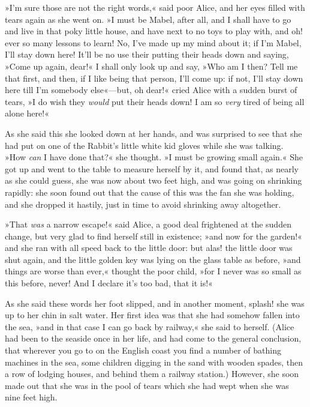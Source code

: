 »I'm sure those are not the right words,« said poor Alice, and her eyes filled with tears again as she went on. »I must be Mabel, after all, and I shall have to go and live in that poky little house, and have next to no toys to play with, and oh! ever so many lessons to learn! No, I've made up my mind about it; if I'm Mabel, I'll stay down here! It'll be no use their putting their heads down and saying, »Come up again, dear!« I shall only look up and say, »Who am I then? Tell me that first, and then, if I like being that person, I'll come up: if not, I'll stay down here till I'm somebody else«—but, oh dear!« cried Alice with a sudden burst of tears, »I do wish they \textit{would} put their heads down! I am so \textit{very} tired of being all alone here!«




As she said this she looked down at her hands, and was surprised to see that she had put on one of the Rabbit's little white kid gloves while she was talking. »How \textit{can} I have done that?« she thought. »I must be growing small again.« She got up and went to the table to measure herself by it, and found that, as nearly as she could guess, she was now about two feet high, and was going on shrinking rapidly: she soon found out that the cause of this was the fan she was holding, and she dropped it hastily, just in time to avoid shrinking away altogether.

»That \textit{was} a narrow escape!« said Alice, a good deal frightened at the sudden change, but very glad to find herself still in existence; »and now for the garden!« and she ran with all speed back to the little door: but alas! the little door was shut again, and the little golden key was lying on the glass table as before, »and things are worse than ever,« thought the poor child, »for I never was so small as this before, never! And I declare it's too bad, that it is!«

As she said these words her foot slipped, and in another moment, splash! she was up to her chin in salt water. Her first idea was that she had somehow fallen into the sea, »and in that case I can go back by railway,« she said to herself. (Alice had been to the seaside once in her life, and had come to the general conclusion, that wherever you go to on the English coast you find a number of bathing machines in the sea, some children digging in the sand with wooden spades, then a row of lodging houses, and behind them a railway station.) However, she soon made out that she was in the pool of tears which she had wept when she was nine feet high.




